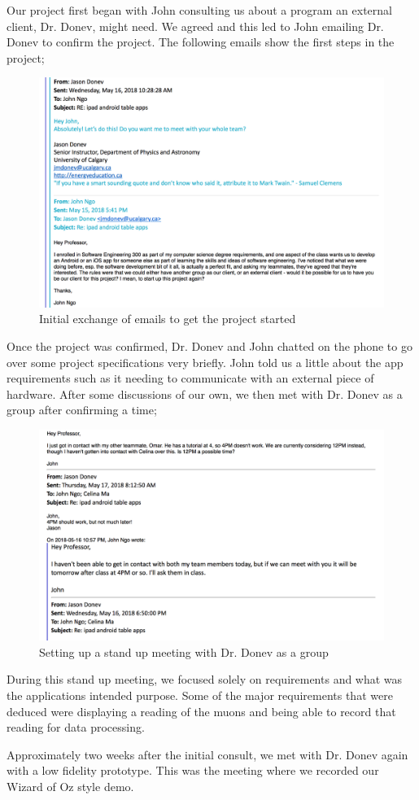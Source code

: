 \documentclass[11pt,a4paper]{article}
\begin{document}
Our project first began with John consulting us about a program an external client, Dr. Donev, might need. We agreed and this led to John emailing Dr. Donev to confirm the project. The following emails show the first steps in the project; 
\bigskip
\begin{figure}[h]
  \centering
      \includegraphics[width=1.1\textwidth]{1.png}
  \caption{Initial exchange of emails to get the project started}
\end{figure}

\newpage
Once the project was confirmed, Dr. Donev and John chatted on the phone to go over some project specifications very briefly. John told us a little about the app requirements such as it needing to communicate with an external piece of hardware. After some discussions of our own, we then met with Dr. Donev as a group after confirming a time;


\bigskip
\begin{figure}[h]
  \centering
      \includegraphics[width=1.1\textwidth]{3.png}

  \caption{Setting up a stand up meeting with Dr. Donev as a group}
\end{figure}


During this stand up meeting, we focused solely on requirements and what was the applications intended purpose. Some of the major requirements that were deduced were displaying a reading of the muons and being able to record that reading for data processing.

Approximately two weeks after the initial consult, we met with Dr. Donev again with a low fidelity prototype. This was the meeting where we recorded our Wizard of Oz style demo. 
\end{document}

